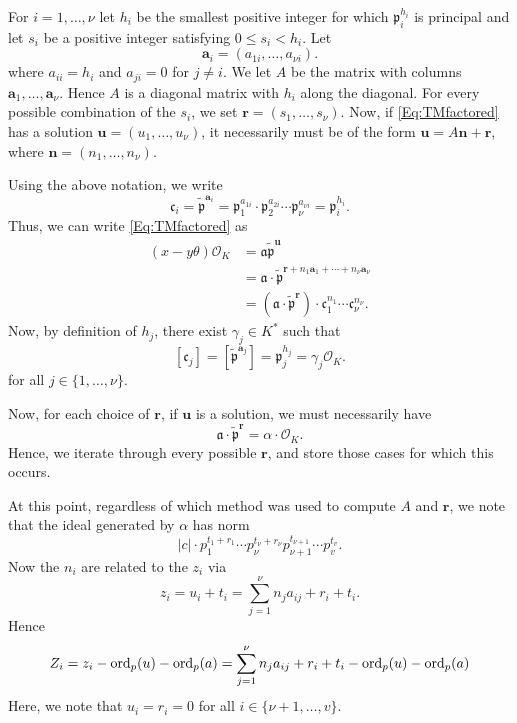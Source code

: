 For $i = 1, \dots, {\nu}$ let $h_i$ be the smallest positive integer for which $\mathfrak{p}_i^{h_i}$ is principal and let 
$s_i$ be a positive integer satisfying $0 \leq s_i < h_i$. Let
\[\mathbf{a}_i = (a_{1i}, \dots, a_{{\nu}i}).\]
where $a_{ii} = h_i$ and $a_{ji} = 0$ for $j \neq i$. We let $A$ be the matrix with columns $\mathbf{a}_1, \dots, \mathbf{a}_{\nu}$. Hence $A$ is a diagonal matrix with $h_i$ along the diagonal. For every possible combination of the $s_i$, we set $\mathbf{r} = (s_1, \dots, s_{\nu})$. Now, if \eqref{Eq:TMfactored} has a solution $\mathbf{u} = (u_1, \dots, u_{\nu})$, it necessarily must be of the form $\mathbf{u} = A\mathbf{n} + \mathbf{r}$, where $\mathbf{n} = (n_1, \dots, n_{\nu})$. 

Using the above notation, we write
\[\mathfrak{c}_i = \tilde{\mathfrak{p}}^{\mathbf{a}_i}=\mathfrak{p}_1^{a_{1i}}\cdot \mathfrak{p}_2^{a_{2i}} \cdots \mathfrak{p}_{\nu}^{a_{{\nu}i}} = \mathfrak{p}_i^{h_i}.\]
Thus, we can write \eqref{Eq:TMfactored} as
\[\begin{array}{ll}
(x-y\theta) \mathcal{O}_K 
	& = \mathfrak{a} \tilde{\mathfrak{p}}^{\mathbf{u}}\\ 
	& = \mathfrak{a} \cdot \tilde{\mathfrak{p}}^{\mathbf{r} + n_1 \mathbf{a}_1 + \cdots + n_{\nu} \mathbf{a}_{\nu}}\\
	& = (\mathfrak{a} \cdot \tilde{\mathfrak{p}}^\mathbf{r}) \cdot \mathfrak{c}_1^{n_1}\cdots \mathfrak{c}_{\nu}^{n_{\nu}}.
\end{array}\]
Now, by definition of $h_j$, there exist $\gamma_j \in K^*$ such that 
\[[\mathfrak{c}_j] = [\tilde{\mathfrak{p}}^{\mathbf{a}_j}] = \mathfrak{p}_j^{h_j} = \gamma_j \mathcal{O}_K.\]
for all $j \in \{1, \dots, {\nu}\}$.

Now, for each choice of $\mathbf{r}$, if $\mathbf{u}$ is a solution, we must necessarily have
\[\mathfrak{a} \cdot \tilde{\mathfrak{p}}^\mathbf{r}=\alpha \cdot \mathcal{O}_K.\]
Hence, we iterate through every possible $\mathbf{r}$, and store those cases for which this occurs. 


At this point, regardless of which method was used to compute $A$ and $\mathbf{r}$, we note that the ideal generated by $\alpha$ has norm
\[|c|\cdot p_1^{t_1 + r_1} \cdots p_{\nu}^{t_{\nu} + r_{\nu}}p_{\nu +1}^{t_{\nu +1}} \cdots p_v^{t_v}.\]
Now the $n_i$ are related to the $z_i$ via
\[z_i = u_i + t_i = \sum_{j = 1}^{\nu}n_ja_{ij} + r_i + t_i.\]
Hence
\[Z_i = z_i - \operatorname{ord}_p(u) - \operatorname{ord}_p(a) = \sum_{j = 1}^{\nu}n_ja_{ij} + r_i + t_i - \operatorname{ord}_p(u) - \operatorname{ord}_p(a) \]
Here, we note that $u_i = r_i = 0$ for all $i \in \{\nu + 1, \dots, v\}$. 


